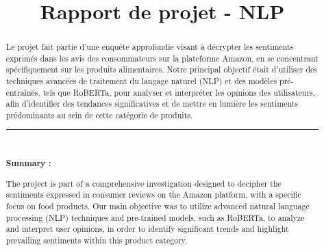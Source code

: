 \documentclass{rapportCS}
\title{Rapport de projet - NLP}
\begin{document}








        
\fairemarges %
\fairepagedegarde %

\begin{center}
	\begin{abstract}
       
        Le projet fait partie d'une enquête approfondie visant à décrypter les sentiments exprimés dans les avis des consommateurs sur la plateforme Amazon, en se concentrant spécifiquement sur les produits alimentaires. Notre principal objectif était d'utiliser des techniques avancées de traitement du langage naturel (NLP) et des modèles pré-entraînés, tels que RoBERTa, pour analyser et interpréter les opinions des utilisateurs, afin d'identifier des tendances significatives et de mettre en lumière les sentiments prédominants au sein de cette catégorie de produits. 
        
        \rule{\linewidth}{0.2 mm} \\[0.4 cm]
        \begin{center}\textbf{Summary :}\end{center} 
        The project is part of a comprehensive investigation designed to decipher the sentiments expressed in consumer reviews on the Amazon platform, with a specific focus on food products. Our main objective was to utilize advanced natural language processing (NLP) techniques and pre-trained models, such as RoBERTa, to analyze and interpret user opinions, in order to identify significant trends and highlight prevailing sentiments within this product category.
    \end{abstract}
\end{center}
\newpage
\end{document}
